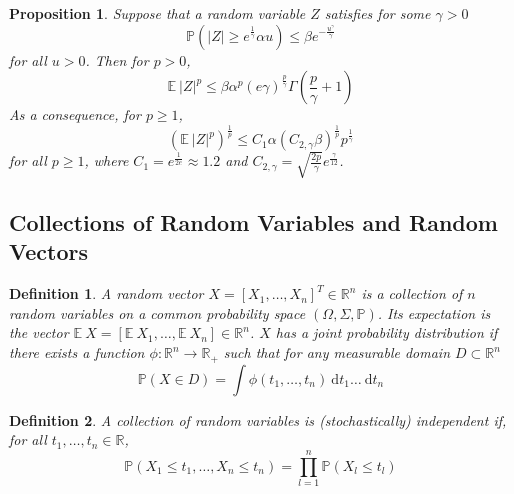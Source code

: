 \documentclass[10pt,a4paper]{article}
\theoremstyle{thmstyle}
\newtheorem{definition}{Definition}
\newtheorem{proposition}{Proposition}
\newcommand{\diff}{~\mathrm{d}}
\newcommand{\E}{\mathbb{E}~}
\renewcommand{\Pr}[1]{\mathbb{P}\left( #1 \right)}
\begin{document}
\begin{proposition}
  Suppose that a random variable $Z$ satisfies for some $\gamma > 0$
  \begin{equation*}
    \Pr{|Z| \ge e^{\frac{1}{\gamma}} \alpha u} \le \beta e^{-\frac{u^{\gamma}}{\gamma}}
  \end{equation*}
  for all $u > 0$.
  Then for $p > 0$,
  \begin{equation*}
    \E |Z|^{p} \le \beta \alpha^{p} (e \gamma)^{\frac{p}{\gamma}} \Gamma\left( \frac{p}{\gamma} + 1 \right)
  \end{equation*}
  As a consequence, for $p \ge 1$,
  \begin{equation*}
    \left( \E |Z|^{p} \right)^{\frac{1}{p}} \le C_{1} \alpha \left( C_{2,\gamma} \beta \right)^{\frac{1}{p}} p^{\frac{1}{\gamma}}
  \end{equation*}
  for all $p \ge 1$, where $C_{1} = e^{\frac{1}{2e}} \approx 1.2$ and $C_{2,\gamma} = \sqrt{\frac{2p}{\gamma}} e^{\frac{\gamma}{12}}$.
\end{proposition}

\subsection{Collections of Random Variables and Random Vectors}

\begin{definition}
  A \emph{random vector} $X = [X_{1}, \dots, X_{n}]^{T} \in \mathbb{R}^{n}$ is a collection of $n$ random variables on a common probability space $(\Omega, \Sigma, \mathbb{P})$.
  Its expectation is the vector $\E X = [\E X_{1}, \dots, \E X_{n}] \in \mathbb{R}^{n}$.
  $X$ has a \emph{joint probability distribution} if there exists a function $\phi : \mathbb{R}^{n} \rightarrow \mathbb{R}_{+}$ such that for any measurable domain $D \subset \mathbb{R}^{n}$
  \begin{equation*}
    \Pr{X \in D} = \int \phi(t_{1}, \dots, t_{n}) \diff t_{1} \dots \diff t_{n}
  \end{equation*}
\end{definition}

\begin{definition}
  A collection of random variables is \emph{(stochastically) independent} if, for all $t_{1}, \dots, t_{n} \in \mathbb{R}$,
  \begin{equation*}
    \Pr{X_{1} \le t_{1}, \dots, X_{n} \le t_{n}} = \prod_{l = 1}^{n} \Pr{X_{l} \le t_{l}}
  \end{equation*}
\end{definition}
\end{document}
